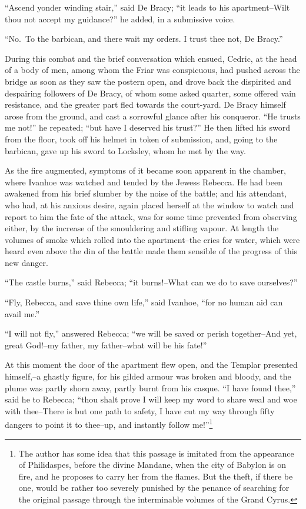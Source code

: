 ``Ascend yonder winding stair,'' said De Bracy; ``it leads to his
apartment--Wilt thou not accept my guidance?'' he added, in a submissive
voice.

``No.~To the barbican, and there wait my orders. I trust thee not, De
Bracy.''

During this combat and the brief conversation which ensued, Cedric, at
the head of a body of men, among whom the Friar was conspicuous, had
pushed across the bridge as soon as they saw the postern open, and drove
back the dispirited and despairing followers of De Bracy, of whom some
asked quarter, some offered vain resistance, and the greater part fled
towards the court-yard. De Bracy himself arose from the ground, and cast
a sorrowful glance after his conqueror. ``He trusts me not!'' he
repeated; ``but have I deserved his trust?'' He then lifted his sword
from the floor, took off his helmet in token of submission, and, going
to the barbican, gave up his sword to Locksley, whom he met by the way.

As the fire augmented, symptoms of it became soon apparent in the
chamber, where Ivanhoe was watched and tended by the Jewess Rebecca. He
had been awakened from his brief slumber by the noise of the battle; and
his attendant, who had, at his anxious desire, again placed herself at
the window to watch and report to him the fate of the attack, was for
some time prevented from observing either, by the increase of the
smouldering and stifling vapour. At length the volumes of smoke which
rolled into the apartment--the cries for water, which were heard even
above the din of the battle made them sensible of the progress of this
new danger.

``The castle burns,'' said Rebecca; ``it burns!--What can we do to save
ourselves?''

``Fly, Rebecca, and save thine own life,'' said Ivanhoe, ``for no human
aid can avail me.''

``I will not fly,'' answered Rebecca; ``we will be saved or perish
together--And yet, great God!--my father, my father--what will be his
fate!''

At this moment the door of the apartment flew open, and the Templar
presented himself,--a ghastly figure, for his gilded armour was broken
and bloody, and the plume was partly shorn away, partly burnt from his
casque. ``I have found thee,'' said he to Rebecca; ``thou shalt prove I
will keep my word to share weal and woe with thee--There is but one path
to safety, I have cut my way through fifty dangers to point it to
thee--up, and instantly follow me!''\footnote{The author has some idea
that this passage is imitated
from the appearance of Philidaspes, before the divine Mandane, when the
city of Babylon is on fire, and he proposes to carry her from the
flames. But the theft, if there be one, would be rather too severely
punished by the penance of searching for the original passage through
the interminable volumes of the Grand Cyrus.}

